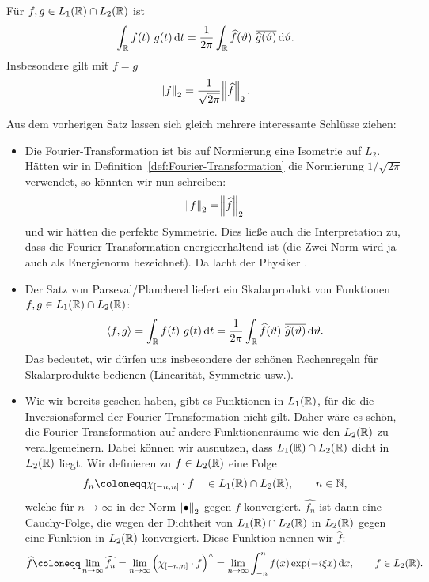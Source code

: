 \begin{proposition}
Für $ f, g \in L_{1}(\mathbb{R}) \cap L_{2}(\mathbb{R}) $ ist
\[
    \int_{\R} f(t) \ g(t) \dif t 
  = \frac{1}{2\pi} \int_{\R} \widehat{f}(\vartheta) \ \overline{\widehat{g}(\vartheta)}
      \dif \vartheta.
\]
Insbesondere gilt mit $ f = g $
\[
  \norm{f}_{2} = \frac{1}{\sqrt{2\pi}} \norm{\widehat{f}}_{2}.
\]
\end{proposition}

\begin{remark}
Aus dem vorherigen Satz lassen sich gleich mehrere interessante Schlüsse ziehen:
\begin{itemize}
\item Die Fourier-Transformation ist bis auf Normierung eine Isometrie auf $ L_{2} $. Hätten wir in 
  Definition~\ref{def:Fourier-Transformation} die Normierung $ 1 / \sqrt{2\pi} $ verwendet, so
  könnten wir nun schreiben:
  \[
    \norm{f}_{2} = \norm{\widehat{f}}_{2}
  \]
  und wir hätten die perfekte Symmetrie. Dies ließe auch die Interpretation zu, dass die 
  Fourier-Transformation energieerhaltend ist (die Zwei-Norm wird ja auch als Energienorm 
  bezeichnet). Da lacht der Physiker \smiley.
\item Der Satz von Parseval/Plancherel liefert ein Skalarprodukt von Funktionen
  $ f, g \in L_{1}(\mathbb{R}) \cap L_{2}(\mathbb{R}) $:
  \[
      \langle f, g \rangle 
    = \int_{\R} f(t) \ g(t) \dif t
    = \frac{1}{2\pi} \int_{\R} \widehat{f}(\vartheta) \ \overline{\widehat{g}(\vartheta)}
          \dif \vartheta.
  \]
  Das bedeutet, wir dürfen uns insbesondere der schönen Rechenregeln für Skalarprodukte bedienen
  (Linearität, Symmetrie usw.).
\item Wie wir bereits gesehen haben, gibt es Funktionen in $ L_{1}(\mathbb{R}) $, für die die 
  Inversionsformel der Fourier-Transformation nicht gilt. Daher wäre es schön, die
  Fourier-Transformation auf andere Funktionenräume wie den $ L_{2}(\mathbb{R}) $ zu verallgemeinern. Dabei
  können wir ausnutzen, dass $ L_{1}(\mathbb{R}) \cap L_{2}(\mathbb{R}) $ dicht in $ L_{2}(\mathbb{R}) $ liegt. Wir
  definieren zu $ f \in L_{2}(\mathbb{R}) $ eine Folge
  \[
    f_{n} \coloneqq \chi_{[-n,n]} \cdot f \quad \in L_{1}(\R) \cap L_{2}(\R), \qquad n \in \N,
  \]
  welche für $ n \to \infty $ in der Norm $ \norm{\bullet}_{2} $ gegen $ f $ konvergiert.
  $ \widehat{f_{n}} $ ist dann eine Cauchy-Folge, die wegen der Dichtheit von $ L_{1}(\mathbb{R}) \cap 
  L_{2}(\mathbb{R}) $ in $ L_{2}(\mathbb{R}) $ gegen eine Funktion in $ L_{2}(\mathbb{R}) $ konvergiert. Diese Funktion 
  nennen wir $ \widehat{f} $:
  \[
      \widehat{f} \coloneqq \lim\limits_{n \to \infty} \widehat{f_{n}}
    = \lim\limits_{n \to \infty} \left( \chi_{[-n,n]} \cdot f \right)^{\wedge}
    = \lim\limits_{n \to \infty} \int_{-n}^{n} f(x) \exp(-i\xi x) \dif x,
      \qquad f \in L_{2}(\R).
  \]
  
\end{itemize}
\end{remark}


